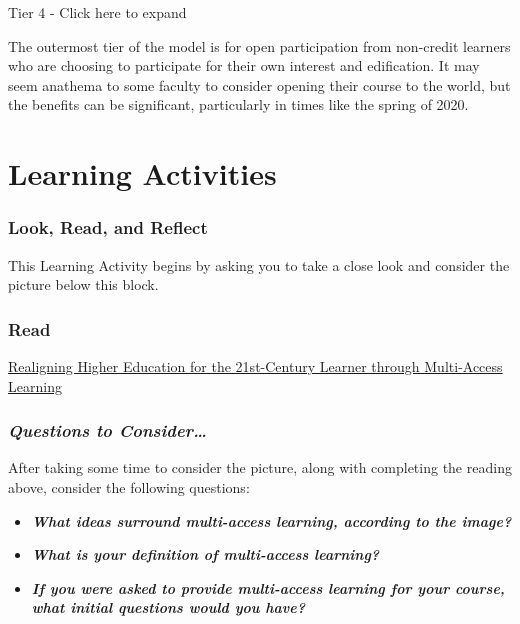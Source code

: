 \documentclass[
]{book}
\providecommand{\tightlist}{%
  \setlength{\itemsep}{0pt}\setlength{\parskip}{0pt}}
\begin{document}
Tier 4 - Click here to expand

The outermost tier of the model is for open participation from non-credit learners who are choosing to participate for their own interest and edification. It may seem anathema to some faculty to consider opening their course to the world, but the benefits can be significant, particularly in times like the spring of 2020.

\hypertarget{learning-activities}{%
\section*{Learning Activities}\label{learning-activities}}

\begin{reflect}
\hypertarget{look-read-and-reflect}{%
\subsubsection*{Look, Read, and Reflect}\label{look-read-and-reflect}}

This Learning Activity begins by asking you to take a close look and consider the picture below this block.

\hypertarget{read}{%
\subsubsection{Read}\label{read}}

\href{https://jolt.merlot.org/vol9no2/irvine_0613.htm}{Realigning Higher Education for the 21st-Century Learner through Multi-Access Learning}

\hypertarget{questions-to-consider-4}{%
\subsubsection*{\texorpdfstring{\textbf{\emph{Questions to Consider\ldots{}}}}{Questions to Consider\ldots{}}}\label{questions-to-consider-4}}

After taking some time to consider the picture, along with completing the reading above, consider the following questions:

\begin{itemize}
\tightlist
\item
  \textbf{\emph{What ideas surround multi-access learning, according to the image?}}
\item
  \textbf{\emph{What is your definition of multi-access learning?}}
\item
  \textbf{\emph{If you were asked to provide multi-access learning for your course, what initial questions would you have?}}
\end{itemize}
\end{reflect}
\end{document}
